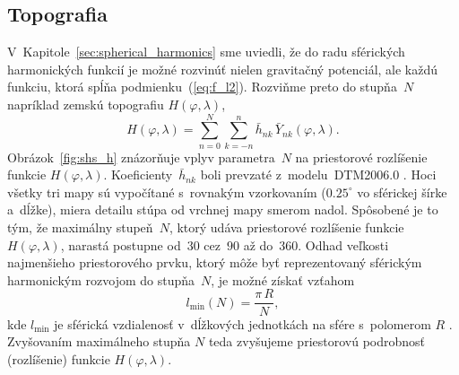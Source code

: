 \documentclass[a4paper, 12pt]{book}
\begin{document}
\subsection{Topografia}
\label{sec:sh_applications_topography}

V~Kapitole~\ref{sec:spherical_harmonics} sme uviedli, že do radu sférických
harmonických funkcií je možné rozvinúť nielen gravitačný potenciál, ale každú
funkciu, ktorá spĺňa podmienku~(\ref{eq:f_l2}).  Rozviňme preto do stupňa~$N$ 
napríklad zemskú topografiu $H(\varphi, \lambda)$,
%
\begin{equation}
\label{eq:h_shs}
H(\varphi, \lambda) = \sum_{n = 0}^{N} \sum_{k = -n}^n \bar{h}_{nk} \,
\bar{Y}_{nk}(\varphi, \lambda){.}
\end{equation}
%
Obrázok~\ref{fig:shs_h} znázorňuje vplyv parametra~$N$ na priestorové 
rozlíšenie funkcie $H(\varphi, \lambda)$.  Koeficienty~$\bar{h}_{nk}$ boli 
prevzaté z~modelu~DTM2006.0 \parencite{DTM2006}.  Hoci všetky tri mapy sú 
vypočítané s~rovnakým vzorkovaním ($0.25^{\circ}$ vo sférickej šírke a~dĺžke), 
miera detailu stúpa od vrchnej mapy smerom nadol.  Spôsobené je to tým, že 
maximálny stupeň~$N$, ktorý udáva priestorové rozlíšenie funkcie 
$H(\varphi,\lambda)$, narastá postupne od~$30$ cez~$90$ až do~$360$.  Odhad 
veľkosti najmenšieho priestorového prvku, ktorý môže byť reprezentovaný 
sférickým harmonickým rozvojom do stupňa~$N$, je možné získať vzťahom
%
\begin{equation}
l_{\min}(N) = \frac{\pi \, R}{N}{,}
\end{equation}
%
kde $l_{\min}$ je sférická vzdialenosť v~dĺžkových jednotkách na sfére 
s~polomerom $R$ \parencite{Barthelmes2013}.  Zvyšovaním
maximálneho stupňa $N$ teda zvyšujeme priestorovú podrobnosť (rozlíšenie) 
funkcie $H(\varphi, \lambda)$.
\end{document}
